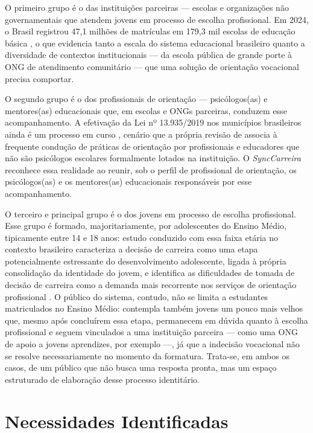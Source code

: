 O primeiro grupo é o das instituições parceiras --- escolas e organizações não governamentais que atendem jovens em processo de escolha profissional. Em 2024, o Brasil registrou 47,1 milhões de matrículas em 179,3 mil escolas de educação básica \cite{inep2025censoescolar}, o que evidencia tanto a escala do sistema educacional brasileiro quanto a diversidade de contextos institucionais --- da escola pública de grande porte à ONG de atendimento comunitário --- que uma solução de orientação vocacional precisa comportar.

O segundo grupo é o dos profissionais de orientação --- psicólogos(as) e mentores(as) educacionais que, em escolas e ONGs parceiras, conduzem esse acompanhamento. A efetivação da Lei nº 13.935/2019 nos municípios brasileiros ainda é um processo em curso \cite{cfpcfess2022}, cenário que a própria revisão de  associa à frequente condução de práticas de orientação por profissionais e educadores que não são psicólogos escolares formalmente lotados na instituição. O \textit{SyncCarreira} reconhece essa realidade ao reunir, sob o perfil de profissional de orientação, os psicólogos(as) e os mentores(as) educacionais responsáveis por esse acompanhamento.

O terceiro e principal grupo é o dos jovens em processo de escolha profissional. Esse grupo é formado, majoritariamente, por adolescentes do Ensino Médio, tipicamente entre 14 e 18 anos: estudo conduzido com essa faixa etária no contexto brasileiro caracteriza a decisão de carreira como uma etapa potencialmente estressante do desenvolvimento adolescente, ligada à própria consolidação da identidade do jovem, e identifica as dificuldades de tomada de decisão de carreira como a demanda mais recorrente nos serviços de orientação profissional \cite{silva2021}. O público do sistema, contudo, não se limita a estudantes matriculados no Ensino Médio: contempla também jovens um pouco mais velhos que, mesmo após concluírem essa etapa, permanecem em dúvida quanto à escolha profissional e seguem vinculados a uma instituição parceira --- como uma ONG de apoio a jovens aprendizes, por exemplo ---, já que a indecisão vocacional não se resolve necessariamente no momento da formatura. Trata-se, em ambos os casos, de um público que não busca uma resposta pronta, mas um espaço estruturado de elaboração desse processo identitário.

\section{Necessidades Identificadas}\label{sec:necessidades}

